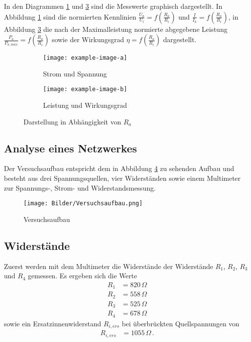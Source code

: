 In den Diagrammen \ref{fig:stromSpannungsKennlinie} und \ref{fig:leistungWirkungsgrad} sind die Messwerte graphisch dargestellt. In Abbildung \ref{fig:stromSpannungsKennlinie} sind die normierten Kennlinien $\frac{U_a}{U_l}=f\left(\frac{R_a}{R_i}\right)$ und $\frac{I}{I_k}=f\left(\frac{R_a}{R_i}\right)$, in Abbildung \ref{fig:leistungWirkungsgrad} die nach der Maximalleistung normierte abgegebene Leistung $\frac{P_a}{P_{a,max}}=f\left(\frac{R_a}{R_i}\right)$ sowie der Wirkungsgrad $\eta=f\left(\frac{R_a}{R_i}\right)$ dargestellt.

\begin{figure}[ht]
    \begin{subfigure}[h]{0.4\linewidth}
        \texttt{[image: example-image-a]}
        \caption{Strom und Spannung}
        \label{fig:stromSpannungsKennlinie}
    \end{subfigure}
    \hfill
    \begin{subfigure}[h]{0.4\linewidth}
        \texttt{[image: example-image-b]}
        \caption{Leistung und Wirkungsgrad}
        \label{fig:leistungWirkungsgrad}
    \end{subfigure}
    \caption{Darstellung in Abhängigkeit von $R_a$}
\end{figure}

\subsection{Analyse eines Netzwerkes}
Der Versuchsaufbau entspricht dem in Abbildung \ref{fig:versuchsaufbauNetzwerk} zu sehenden Aufbau und besteht aus drei Spannungsquellen, vier Widerständen sowie einem Multimeter zur Spannungs-, Strom- und Widerstandsmessung.
\begin{figure}[ht]
    \centering
    \texttt{[image: Bilder/Versuchsaufbau.png]}
    \caption{Versuchsaufbau}
    \label{fig:versuchsaufbauNetzwerk}
\end{figure}

\subsection*{Widerstände}
Zuerst werden mit dem Multimeter die Widerstände der Widerstände $R_1$, $R_2$, $R_3$ und $R_4$ gemessen. Es ergeben sich die Werte
\begin{align*}
    R_1 & = 820\,\Omega \\
    R_2 & = 558\,\Omega \\
    R_3 & = 525\,\Omega \\
    R_4 & = 678\,\Omega
\end{align*}
sowie ein Ersatzinnenwiderstand $R_{i,ers}$ bei überbrückten Quellspannungen von
\begin{align*}
    R_{i,ers} & = 1055\,\Omega\, .
\end{align*}

